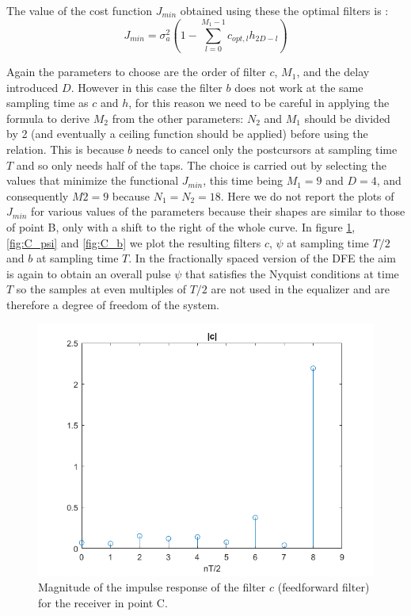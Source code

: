 \documentclass[a4paper,11.5pt]{article}
\begin{document}
The value of the cost function $J_{min}$ obtained using these the optimal filters is :
\begin{equation} \label{eq:C_jmin}
J_{min} = \sigma^2_a \left( 1-\sum_{l=0}^{M_1-1} c_{opt,l}h_{2D-l}\right)
\end{equation}

Again the parameters to choose are the order of filter $c$, $M_1$, and the delay introduced $D$. However in this case the filter $b$ does not work at the same sampling time as $c$ and $h$, for this reason we need to be careful in applying the formula to derive $M_2$ from the other parameters: $N_2$ and $M_1$ should be divided by 2 (and eventually a ceiling function should be applied) before using the relation. This is because $b$ needs to cancel only the postcursors at sampling time $T$ and so only needs half of the taps. The choice is carried out by selecting the values that minimize the functional $J_{min}$, this time being $M_1=9$ and $D=4$, and consequently $M2=9$ because $N_1=N_2=18$. Here we do not report the plots of $J_{min}$ for various values of the parameters because their shapes are similar to those of point B, only with a shift to the right of the whole curve.  In figure \ref{fig:C_c}, \ref{fig:C_psi} and \ref{fig:C_b} we plot the resulting filters $c$, $\psi$ at sampling time $T/2$ and $b$ at sampling time $T$. In the fractionally spaced version of the DFE the aim is again to obtain an overall pulse $\psi$ that satisfies the Nyquist conditions at time $T$ so the samples at even multiples of $T/2$ are not used in the equalizer and are therefore a degree of freedom of the system.

\begin{figure}[H]
	\begin{center}   
		\includegraphics[width=\textwidth]{figs/C_c.png} 
		\caption{Magnitude of the impulse response of the filter $c$ (feedforward filter) for the receiver in point C.}
		\label{fig:C_c}
	\end{center}
\end{figure}
\end{document}
